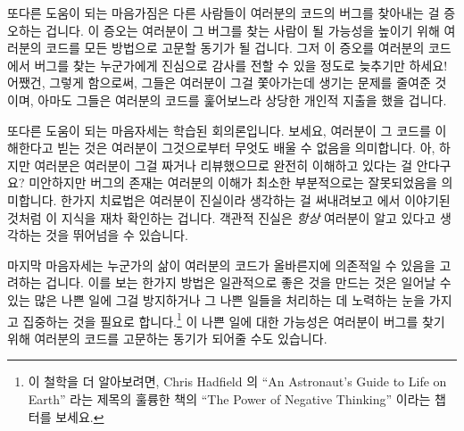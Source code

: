 \fi

또다른 도움이 되는 마음가짐은 다른 사람들이 여러분의 코드의 버그를 찾아내는 걸
증오하는 겁니다.
이 증오는 여러분이 그 버그를 찾는 사람이 될 가능성을 높이기 위해 여러분의
코드를 모든 방법으로 고문할 동기가 될 겁니다.
그저 이 증오를 여러분의 코드에서 버그를 찾는 누군가에게 진심으로 감사를 전할 수
있을 정도로 늦추기만 하세요!
어쨌건, 그렇게 함으로써, 그들은 여러분이 그걸 쫓아가는데 생기는 문제를 줄여준
것이며, 아마도 그들은 여러분의 코드를 훑어보느라 상당한 개인적 지출을 했을
겁니다.

또다른 도움이 되는 마음자세는 학습된 회의론입니다.
보세요, 여러분이 그 코드를 이해한다고 빋는 것은 여러분이 그것으로부터 무엇도
배울 수 없음을 의미합니다.
아, 하지만 여러분은 여러분이 그걸 짜거나 리뷰했으므로 완전히 이해하고 있다는 걸
안다구요?
미안하지만 버그의 존재는 여러분의 이해가 최소한 부분적으로는 잘못되었음을
의미합니다.
한가지 치료법은 여러분이 진실이라 생각하는 걸 써내려보고
 에서 이야기된
것처럼 이 지식을 재차 확인하는 겁니다.
객관적 진실은 \emph{항상} 여러분이 알고 있다고 생각하는 것을 뛰어넘을 수
있습니다.

마지막 마음자세는 누군가의 삶이 여러분의 코드가 올바른지에 의존적일 수 있음을
고려하는 겁니다.
이를 보는 한가지 방법은 일관적으로 좋은 것을 만드는 것은 일어날 수 있는 많은
나쁜 일에 그걸 방지하거나 그 나쁜 일들을 처리하는 데 노력하는 눈을 가지고
집중하는 것을 필요로 합니다.\footnote{
	이 철학을 더 알아보려면, Chris Hadfield 의
	``An Astronaut's Guide to Life on Earth'' 라는 제목의 훌륭한 책의
	``The Power of Negative Thinking'' 이라는 챕터를 보세요.}
이 나쁜 일에 대한 가능성은 여러분이 버그를 찾기 위해 여러분의 코드를 고문하는
동기가 되어줄 수도 있습니다.

